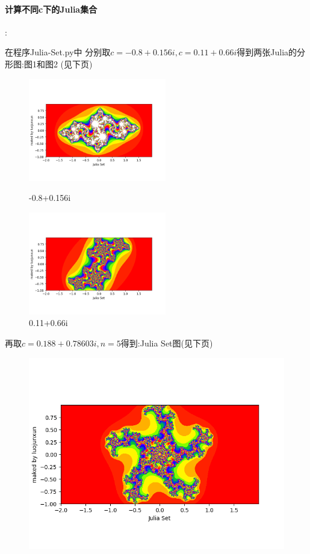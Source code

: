 \documentclass{article}
\begin{document}
    \paragraph{计算不同c下的Julia集合}:\par 
    在程序Julia-Set.py中
    分别取$c =-0.8+0.156i,c = 0.11+0.66i$得到两张Julia的分形图:图1和图2 (见下页)

    \begin{figure}[htbp]
        \centering
        \begin{minipage}[t]{0.48\textwidth}
        \centering
        \includegraphics[width=6cm]{julia with c = (-0.8+0.156j).png}
        \caption{-0.8+0.156i}
        \end{minipage}
        \begin{minipage}[t]{0.48\textwidth}
        \centering
        \includegraphics[width=6cm]{julia with c = (0.11+0.66j).png}
        \caption{0.11+0.66i}
        \end{minipage}
    \end{figure}
    \par
    再取$c = 0.188+0.78603i , n = 5$得到:Julia Set图(见下页)
    \begin{figure}[h]
        \centering
        \includegraphics[scale = 0.6]{julia with c = (0.188+0.78603j).png}
    
    \end{figure}
\end{document}
